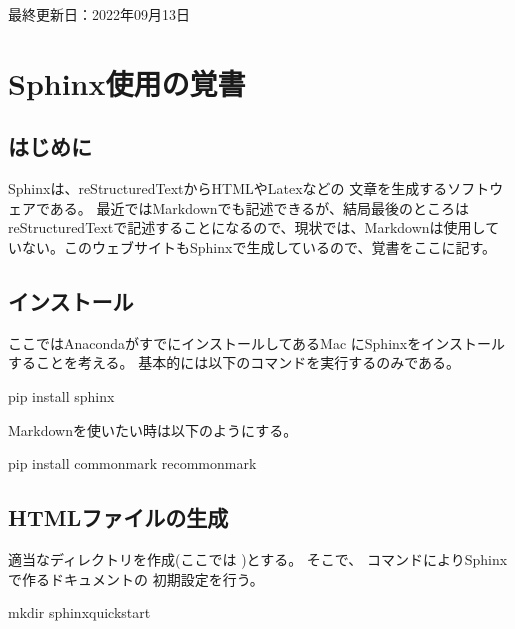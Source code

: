 \documentclass[letterpaper,10pt,dvipdfmx,report]{sphinxmanual}
\begin{document}
\sphinxAtStartPar
最終更新日：2022年09月13日

\sphinxstepscope


\chapter{Sphinx使用の覚書}
\label{\detokenize{sphinx:sphinx}}\label{\detokenize{sphinx::doc}}

\section{はじめに}
\label{\detokenize{sphinx:id1}}
\sphinxAtStartPar
Sphinxは、reStructuredTextからHTMLやLatexなどの
文章を生成するソフトウェアである。
最近ではMarkdownでも記述できるが、結局最後のところはreStructuredTextで記述することになるので、現状では、Markdownは使用していない。このウェブサイトもSphinxで生成しているので、覚書をここに記す。


\section{インストール}
\label{\detokenize{sphinx:id3}}
\sphinxAtStartPar
ここではAnacondaがすでにインストールしてあるMac
にSphinxをインストールすることを考える。
基本的には以下のコマンドを実行するのみである。

\begin{sphinxVerbatim}[commandchars=\\\{\}]
pip install sphinx
\end{sphinxVerbatim}

\sphinxAtStartPar
Markdownを使いたい時は以下のようにする。

\begin{sphinxVerbatim}[commandchars=\\\{\}]
pip install commonmark recommonmark
\end{sphinxVerbatim}


\section{HTMLファイルの生成}
\label{\detokenize{sphinx:html}}
\sphinxAtStartPar
適当なディレクトリを作成(ここでは  )とする。
そこで、  コマンドによりSphinxで作るドキュメントの
初期設定を行う。

\begin{sphinxVerbatim}[commandchars=\\\{\}]
mkdir  
     
sphinx\PYGZhy{}quickstart
\end{sphinxVerbatim}
\end{document}
